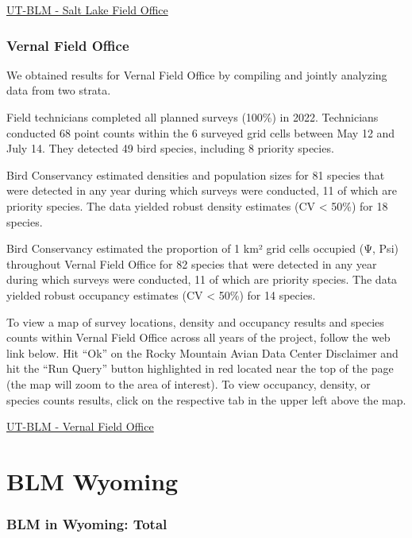 \documentclass[
  letterpaper,
  DIV=11,
  numbers=noendperiod,
  oneside]{scrreprt}
\begin{document}
\href{http://www.rmbo.org/new_site/adc/QueryWindow.aspx\#N4IgzgrgDgpgTmALnAhoiBbEAuABCAVQBUBaAIQBkBZXE3AZRQBtFcKUBrGXAMQEsYTACa4A8gDNxfAMYwQAXyA=}{UT-BLM
- Salt Lake Field Office}

\hypertarget{vernal-field-office}{%
\subsubsection{Vernal Field Office}\label{vernal-field-office}}

We obtained results for Vernal Field Office by compiling and jointly
analyzing data from two strata.

Field technicians completed all planned surveys (100\%) in 2022.
Technicians conducted 68 point counts within the 6 surveyed grid cells
between May 12 and July 14. They detected 49 bird species, including 8
priority species.

Bird Conservancy estimated densities and population sizes for 81 species
that were detected in any year during which surveys were conducted, 11
of which are priority species. The data yielded robust density estimates
(CV \textless{} 50\%) for 18 species.

Bird Conservancy estimated the proportion of 1 km² grid cells occupied
(Ψ, Psi) throughout Vernal Field Office for 82 species that were
detected in any year during which surveys were conducted, 11 of which
are priority species. The data yielded robust occupancy estimates (CV
\textless{} 50\%) for 14 species.

To view a map of survey locations, density and occupancy results and
species counts within Vernal Field Office across all years of the
project, follow the web link below. Hit ``Ok'' on the Rocky Mountain
Avian Data Center Disclaimer and hit the ``Run Query'' button
highlighted in red located near the top of the page (the map will zoom
to the area of interest). To view occupancy, density, or species counts
results, click on the respective tab in the upper left above the map.

\href{http://www.rmbo.org/new_site/adc/QueryWindow.aspx\#N4IgzgrgDgpgTmALnAhoiBbEAuABCAVQBUBaAIQBkBZXE3ANXgDsUAbXAMQEsZWATXAHkAZsK4BjGCAC+QA=}{UT-BLM
- Vernal Field Office}

\hypertarget{blm-wyoming}{%
\section{BLM Wyoming}\label{blm-wyoming}}

\hypertarget{blm-in-wyoming-total}{%
\subsubsection{BLM in Wyoming: Total}\label{blm-in-wyoming-total}}
\end{document}
